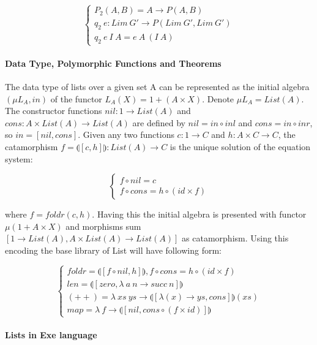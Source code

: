 \documentclass[11pt,oneside]{article}
\begin{document}
$$
\begin{cases}
P_2(A,B) = A \rightarrow P(A,B) \\
q_2\ e : Lim\ G' \rightarrow P ( Lim\ G',  Lim\ G' ) \\
q_2\ e\ I\ A = e\ A\ (I\ A)
\end{cases}
$$

\newpage
  \paragraph{Data Type, Polymorphic Functions and Theorems}
  The data type of lists over a given set A can be represented as the initial algebra
  $(\mu L_A, in)$ of the functor $L_A(X) = 1 + (A \times X)$. Denote $\mu L_A = List(A)$.
  The constructor functions $nil: 1 \rightarrow List(A)$ and
  $cons: A \times List(A) \rightarrow List(A)$ are defined by
  $nil = in \circ inl$ and $cons = in \circ inr$, so $in = [nil,cons]$.
  Given any two functions $c: 1 \rightarrow C$ and $h: A \times C \rightarrow C$,
  the catamorphism $f = \llparenthesis [c,h] \rrparenthesis : List(A) \rightarrow C$
  is the unique solution of the equation system:

$$
\begin{cases}
  f \circ nil  = c \\
  f \circ cons = h \circ (id \times f)
\end{cases}
$$

  where $f = foldr(c,h)$. Having this the initial algebra is presented with functor
  $\mu (1 + A \times X)$ and morphisms sum $[1 \rightarrow List(A), A \times List(A) \rightarrow List(A)]$
  as catamorphism. Using this encoding the base library of List will have following form:

$$
\begin{cases}
 foldr = \llparenthesis [ f \circ nil , h] \rrparenthesis, f \circ cons = h \circ (id \times f)\\
 len = \llparenthesis [ zero, \lambda\ a\ n \rightarrow succ\ n ] \rrparenthesis \\
 (++) = \lambda\ xs\ ys \rightarrow \llparenthesis [ \lambda (x) \rightarrow ys, cons ] \rrparenthesis (xs) \\
 map = \lambda\ f \rightarrow \llparenthesis [ nil, cons \circ (f \times id)] \rrparenthesis
\end{cases}
$$

  \paragraph{Lists in Exe language}
  
\end{document}

